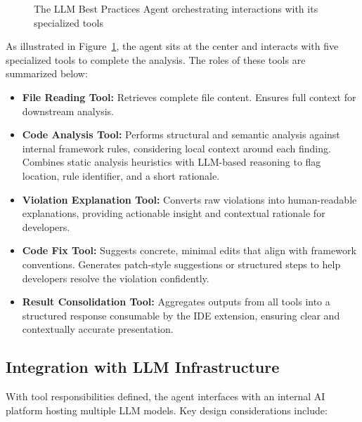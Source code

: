 \begin{spacing}{1.2}
\begin{figure}[H]
\caption{The LLM Best Practices Agent orchestrating interactions with its specialized tools}
\label{fig:agent_tools}
\end{figure}

As illustrated in Figure~\ref{fig:agent_tools}, the agent sits at the center and interacts with five specialized tools to complete the analysis. The roles of these tools are summarized below:

\begin{itemize}
    \item \textbf{File Reading Tool:} Retrieves complete file content. Ensures full context for downstream analysis.
    
    \item \textbf{Code Analysis Tool:} Performs structural and semantic analysis against internal framework rules, considering local context around each finding. Combines static analysis heuristics with LLM-based reasoning to flag location, rule identifier, and a short rationale.
    
    \item \textbf{Violation Explanation Tool:} Converts raw violations into human-readable explanations, providing actionable insight and contextual rationale for developers.
    
    \item \textbf{Code Fix Tool:} Suggests concrete, minimal edits that align with framework conventions. Generates patch‑style suggestions or structured steps to help developers resolve the violation confidently.
    
    \item \textbf{Result Consolidation Tool:} Aggregates outputs from all tools into a structured response consumable by the IDE extension, ensuring clear and contextually accurate presentation.
\end{itemize}

\subsection{Integration with LLM Infrastructure}
With tool responsibilities defined, the agent interfaces with an internal AI platform hosting multiple LLM models. Key design considerations include:


\end{spacing}
